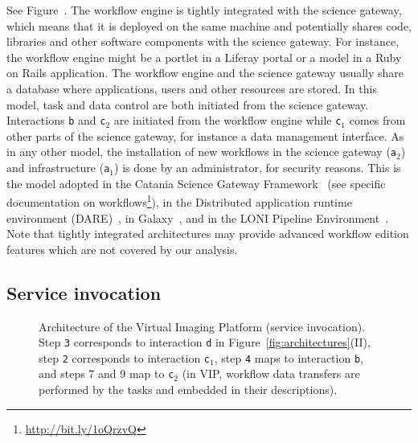 \documentclass[preprint,3p,twocolumn]{elsarticle}
\newcommand{\note}[2]{\pdfmargincomment[color=yellow,author=#1,open=true]{#2}}
\begin{document}
See Figure~. The workflow engine is tightly
integrated with the science gateway, which means that it is deployed
on the same machine and potentially shares code, libraries and other
software components with the science gateway. For instance, the
workflow engine might be a portlet in a Liferay portal or a model
in a Ruby on Rails application. The workflow engine and the science
gateway usually share a database where applications, users and other
resources are stored.  In this model, task and
data control are both initiated from the science gateway. Interactions
\texttt{b} and \texttt{c$_2$} are initiated from the workflow engine
while \texttt{c$_1$} comes from other parts of the science gateway,
for instance a data management interface. As in any other model, the
installation of new workflows in the science gateway (\texttt{a$_2$})
and infrastructure (\texttt{a$_1$}) is done by an administrator, for
security reasons. This is the model adopted in the Catania Science
Gateway Framework~\cite{ardizzone2012decide} (see specific documentation on
workflows\footnote{\url{http://bit.ly/1oQrzvQ}}), in the Distributed
application runtime environment
(DARE)~\cite{maddineni2012distributed}, in
Galaxy~\cite{goecks2010galaxy}, and in the LONI Pipeline
Environment~\cite{dinov2009efficient}. Note that tightly integrated
architectures may provide advanced workflow edition features which are
not covered by our analysis.

\subsection{Service invocation}

\begin{figure}
\centering
\def\svgwidth{1.5\columnwidth}

\caption{Architecture of the Virtual Imaging Platform (service
  invocation).  Step \texttt{3} corresponds to interaction \texttt{d}
  in Figure~\ref{fig:architectures}(II), step \texttt{2} corresponds to
  interaction \texttt{c$_1$}, step \texttt{4} maps to interaction
  \texttt{b}, and steps 7 and 9 map to \texttt{c$_2$} (in VIP, workflow data transfers are
  performed by the tasks and embedded in their descriptions).}
\label{fig:vip-architecture}
\end{figure}
\end{document}
